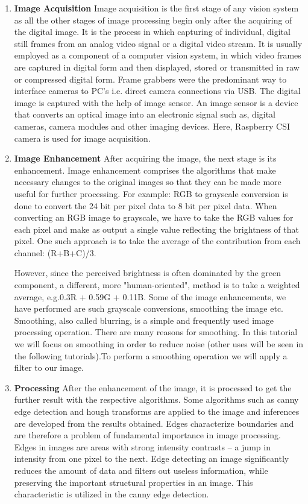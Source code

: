 \documentclass[12pt, a4paper]{article}
\begin{document}
\begin{enumerate}
\item \textbf{Image Acquisition}
Image acquisition is the first stage of any vision system as all the other stages of image processing begin only after the acquiring of the digital image. It is the process in which capturing of
individual, digital still frames from an analog video signal or a digital video stream.
It is usually employed as a component of a computer vision system, in which video
frames are captured in digital form and then displayed, stored or transmitted in raw
or compressed digital form. Frame grabbers were the predominant way to interface
cameras to PC's i.e. direct camera connections via USB. The digital image is captured with the help of image sensor. An image sensor is a device that converts an optical image into an electronic signal such as, digital cameras, camera modules and other imaging devices. Here, Raspberry CSI camera is used for image acquisition.

\item \textbf{Image Enhancement}
After acquiring the image, the next stage is its enhancement. Image enhancement comprises the algorithms that make necessary changes to the original images so that they can be made more useful for further processing. For example: RGB to grayscale conversion is done to convert the 24 bit per pixel data to 8 bit per pixel data. 
When converting an RGB image to
grayscale, we have to take the RGB values for each pixel and make as output a
single value reflecting the brightness of that pixel. One such approach is to take the
average of the contribution from each channel: (R+B+C)/3. 

However, since the
perceived brightness is often dominated by the green component, a different, more "human-oriented", method is to take a weighted average, e.g.0.3R + 0.59G + 0.11B. Some of the image enhancements, we have performed are such grayscale conversions, smoothing the image etc. 
Smoothing, also called blurring, is a simple and
frequently used image processing operation. There are many reasons for
smoothing. In this tutorial we will focus on smoothing in order to reduce noise
(other uses will be seen in the following tutorials).To perform a smoothing
operation we will apply a filter to our image.


\item \textbf{Processing}
After the enhancement of the image, it is processed to get the further result with the respective algorithms. Some algorithms such as canny edge detection and hough transforms are applied to the image and inferences are developed from the results obtained. Edges characterize boundaries and are
therefore a problem of fundamental importance in image processing. Edges in
images are areas with strong intensity contrasts – a jump in intensity from one pixel to the next. Edge detecting an image significantly reduces the amount of data and
filters out useless information, while preserving the important structural properties
in an image. This characteristic is utilized in the canny edge detection.


\end{enumerate}
\end{document}
